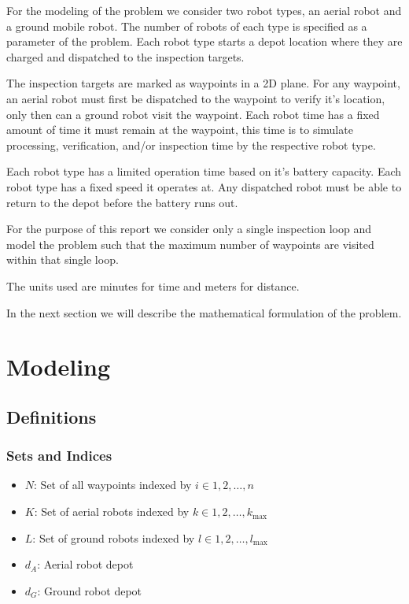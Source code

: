 \documentclass{article}
\begin{document}
		For the modeling of the problem we consider two robot types, an aerial robot and a ground mobile robot. 
		The number of robots of each type is specified as a parameter of the problem.
		Each robot type starts a depot location where they are charged and dispatched to the inspection targets.

		The inspection targets are marked as waypoints in a 2D plane.
		For any waypoint, an aerial robot must first be dispatched to the waypoint to verify it's location, only then can a ground robot visit the waypoint.
		Each robot time has a fixed amount of time it must remain at the waypoint, this time is to simulate processing, verification, and/or inspection time by the respective robot type.

		Each robot type has a limited operation time based on it's battery capacity.
		Each robot type has a fixed speed it operates at.
		Any dispatched robot must be able to return to the depot before the battery runs out.

		For the purpose of this report we consider only a single inspection loop and model the problem such that the maximum number of waypoints are visited within that single loop.

		The units used are minutes for time and meters for distance.

		In the next section we will describe the mathematical formulation of the problem.

	\section{Modeling}

		\subsection{Definitions}


			\subsubsection{Sets and Indices}

				\begin{itemize}
				\item $N$: Set of all waypoints indexed by $i \in {1, 2, \ldots, n}$
				\item $K$: Set of aerial robots indexed by $k \in {1, 2, \ldots, k_{\max}}$
				\item $L$: Set of ground robots indexed by $l \in {1, 2, \ldots, l_{\max}}$
				\item $d_A$: Aerial robot depot
				\item $d_G$: Ground robot depot
				\end{itemize}
\end{document}
